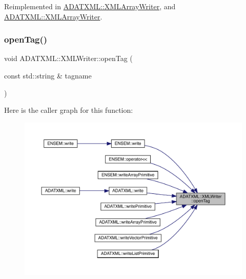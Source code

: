 Reimplemented in \mbox{\hyperlink{classADATXML_1_1XMLArrayWriter_af1602cb14d54aa8e42442f2784c00e22}{A\+D\+A\+T\+X\+M\+L\+::\+X\+M\+L\+Array\+Writer}}, and \mbox{\hyperlink{classADATXML_1_1XMLArrayWriter_af1602cb14d54aa8e42442f2784c00e22}{A\+D\+A\+T\+X\+M\+L\+::\+X\+M\+L\+Array\+Writer}}.

\mbox{\label{classADATXML_1_1XMLWriter_a75da06c5e515ccd9d519501915f50a8f}} 
\subsubsection{\texorpdfstring{openTag()}{openTag()}\hspace{0.1cm}{\footnotesize\ttfamily [1/8]}}
{\footnotesize\ttfamily void A\+D\+A\+T\+X\+M\+L\+::\+X\+M\+L\+Writer\+::open\+Tag (\begin{DoxyParamCaption}\item[{const std\+::string \&}]{tagname }\end{DoxyParamCaption})}

Here is the caller graph for this function\+:\nopagebreak
\begin{figure}[H]
\begin{center}
\leavevmode
\includegraphics[width=350pt]{da/da7/classADATXML_1_1XMLWriter_a75da06c5e515ccd9d519501915f50a8f_icgraph}
\end{center}
\end{figure}
\mbox{\label{classADATXML_1_1XMLWriter_a75da06c5e515ccd9d519501915f50a8f}} 
